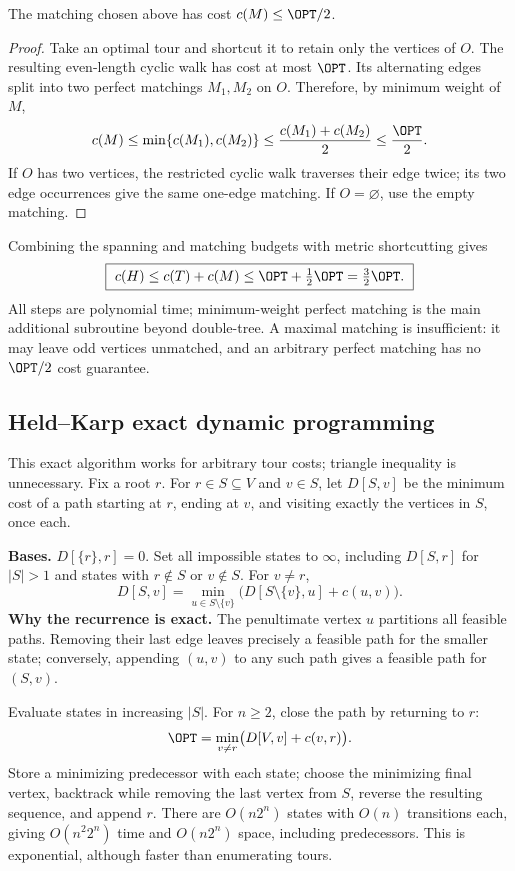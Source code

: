 \begin{lemma}
The matching chosen above has cost $c(M)\le\OPT/2$.
\end{lemma}
\begin{proof}
Take an optimal tour and shortcut it to retain only the vertices of $O$.
The resulting even-length cyclic walk has cost at most $\OPT$.  Its
alternating edges split into two perfect matchings $M_1,M_2$ on $O$.
Therefore, by minimum weight of $M$,
\[
c(M)\le\min\{c(M_1),c(M_2)\}
\le\frac{c(M_1)+c(M_2)}2\le\frac{\OPT}2.
\]
If $O$ has two vertices, the restricted cyclic walk traverses their edge
twice; its two edge occurrences give the same one-edge matching.  If
$O=\varnothing$, use the empty matching.
\end{proof}
Combining the spanning and matching budgets with metric shortcutting gives
\[
\boxed{\ c(H)\le c(T)+c(M)\le\OPT+\tfrac12\OPT
       =\tfrac32\OPT.\ }
\]
All steps are polynomial time; minimum-weight perfect matching is the main
additional subroutine beyond double-tree.  A maximal matching is insufficient:
it may leave odd vertices unmatched, and an arbitrary perfect matching has
no $\OPT/2$ cost guarantee.

\subsection{Held--Karp exact dynamic programming}\label{tsp:heldkarp}
This exact algorithm works for arbitrary tour costs; triangle inequality
is unnecessary.  Fix a root $r$.  For $r\in S\subseteq V$ and $v\in S$,
let $D[S,v]$ be the minimum cost of a path starting at $r$, ending at $v$,
and visiting exactly the vertices in $S$, once each.

\textbf{Bases.} $D[\{r\},r]=0$.  Set all impossible states to $\infty$,
including $D[S,r]$ for $|S|>1$ and states with $r\notin S$ or $v\notin S$.
For $v\ne r$,
\[
\boxed{\ D[S,v]=\min_{u\in S\setminus\{v\}}
        \bigl(D[S\setminus\{v\},u]+c(u,v)\bigr).\ }
\]
\textbf{Why the recurrence is exact.} The penultimate vertex $u$ partitions
all feasible paths.  Removing their last edge leaves precisely a feasible
path for the smaller state; conversely, appending $(u,v)$ to any such path
gives a feasible path for $(S,v)$.

Evaluate states in increasing $|S|$.  For $n\ge2$, close the path by returning
to $r$:
\[
\OPT=\min_{v\ne r}\bigl(D[V,v]+c(v,r)\bigr).
\]
Store a minimizing predecessor with each state; choose the minimizing final
vertex, backtrack while removing the last vertex from $S$, reverse the
resulting sequence, and append $r$.  There are $O(n2^n)$ states with $O(n)$
transitions each, giving $O(n^2 2^n)$ time and $O(n2^n)$ space, including
predecessors.  This is exponential, although faster than enumerating tours.

